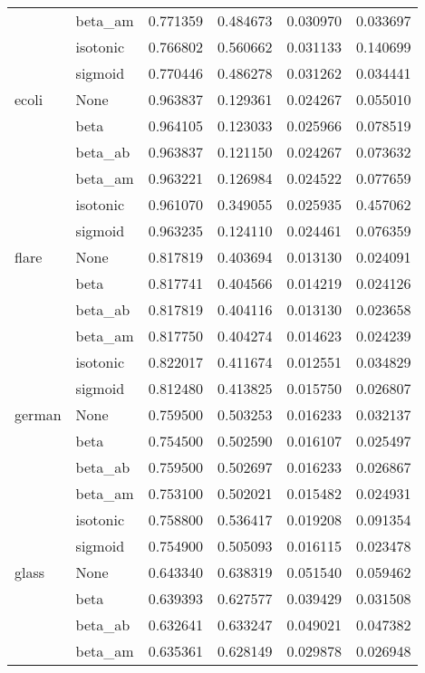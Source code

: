 \begin{tabular}{llrrrr}
        & beta\_am &  0.771359 &  0.484673 &  0.030970 &  0.033697 \\
        & isotonic &  0.766802 &  0.560662 &  0.031133 &  0.140699 \\
        & sigmoid &  0.770446 &  0.486278 &  0.031262 &  0.034441 \\
ecoli & None &  0.963837 &  0.129361 &  0.024267 &  0.055010 \\
        & beta &  0.964105 &  0.123033 &  0.025966 &  0.078519 \\
        & beta\_ab &  0.963837 &  0.121150 &  0.024267 &  0.073632 \\
        & beta\_am &  0.963221 &  0.126984 &  0.024522 &  0.077659 \\
        & isotonic &  0.961070 &  0.349055 &  0.025935 &  0.457062 \\
        & sigmoid &  0.963235 &  0.124110 &  0.024461 &  0.076359 \\
flare & None &  0.817819 &  0.403694 &  0.013130 &  0.024091 \\
        & beta &  0.817741 &  0.404566 &  0.014219 &  0.024126 \\
        & beta\_ab &  0.817819 &  0.404116 &  0.013130 &  0.023658 \\
        & beta\_am &  0.817750 &  0.404274 &  0.014623 &  0.024239 \\
        & isotonic &  0.822017 &  0.411674 &  0.012551 &  0.034829 \\
        & sigmoid &  0.812480 &  0.413825 &  0.015750 &  0.026807 \\
german & None &  0.759500 &  0.503253 &  0.016233 &  0.032137 \\
        & beta &  0.754500 &  0.502590 &  0.016107 &  0.025497 \\
        & beta\_ab &  0.759500 &  0.502697 &  0.016233 &  0.026867 \\
        & beta\_am &  0.753100 &  0.502021 &  0.015482 &  0.024931 \\
        & isotonic &  0.758800 &  0.536417 &  0.019208 &  0.091354 \\
        & sigmoid &  0.754900 &  0.505093 &  0.016115 &  0.023478 \\
glass & None &  0.643340 &  0.638319 &  0.051540 &  0.059462 \\
        & beta &  0.639393 &  0.627577 &  0.039429 &  0.031508 \\
        & beta\_ab &  0.632641 &  0.633247 &  0.049021 &  0.047382 \\
        & beta\_am &  0.635361 &  0.628149 &  0.029878 &  0.026948 \\

\end{tabular}
